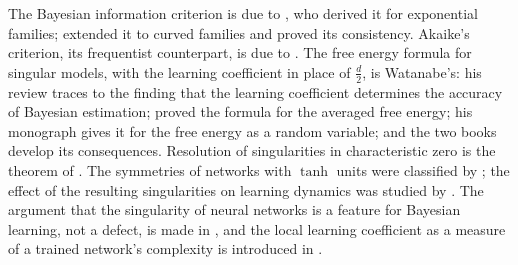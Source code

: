 \begin{refsection}
The Bayesian information criterion is due to \textcite{Schwarz1978}, who derived it for exponential families; \textcite{Haughton1988} extended it to curved families and proved its consistency. Akaike's criterion, its frequentist counterpart, is due to \textcite{Akaike1974}. The free energy formula for singular models, with the learning coefficient in place of $\tfrac d2$, is Watanabe's: his review \parencite{Watanabe2024} traces to \textcite{Watanabe1999} the finding that the learning coefficient determines the accuracy of Bayesian estimation; \textcite{Watanabe2001a} proved the formula for the averaged free energy; his monograph \parencite{Watanabe2009} gives it for the free energy as a random variable; and the two books \parencite{Watanabe2009,Watanabe2018} develop its consequences. Resolution of singularities in characteristic zero is the theorem of \textcite{Hironaka1964a,Hironaka1964b}. The symmetries of networks with $\tanh$ units were classified by \textcite{Sussmann1992}; the effect of the resulting singularities on learning dynamics was studied by \textcite{FukumizuAmari2000}. The argument that the singularity of neural networks is a feature for Bayesian learning, not a defect, is made in \textcite{WeiEtAl2023}, and the local learning coefficient as a measure of a trained network's complexity is introduced in \textcite{LauEtAl2025}.

\printchapterbib
\end{refsection}
\sltfloatrestore
